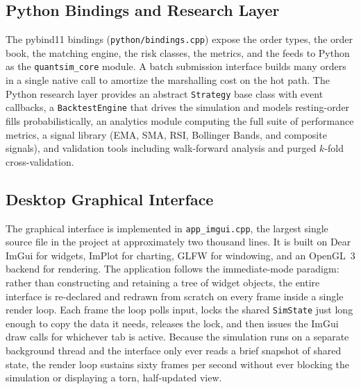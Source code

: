 \documentclass[12pt,oneside,a4paper]{report}
\begin{document}
\subsection{Python Bindings and Research Layer}

The pybind11 bindings (\texttt{python/bindings.cpp}) expose the order types, the order book, the matching engine, the risk classes, the metrics, and the feeds to Python as the \texttt{quantsim\_core} module. A batch submission interface builds many orders in a single native call to amortize the marshalling cost on the hot path. The Python research layer provides an abstract \texttt{Strategy} base class with event callbacks, a \texttt{BacktestEngine} that drives the simulation and models resting-order fills probabilistically, an analytics module computing the full suite of performance metrics, a signal library (EMA, SMA, RSI, Bollinger Bands, and composite signals), and validation tools including walk-forward analysis and purged $k$-fold cross-validation.

\subsection{Desktop Graphical Interface}
\label{sec:gui-module}

The graphical interface is implemented in \texttt{app\_imgui.cpp}, the largest single source file in the project at approximately two thousand lines. It is built on Dear ImGui for widgets, ImPlot for charting, GLFW for windowing, and an OpenGL~3 backend for rendering. The application follows the immediate-mode paradigm: rather than constructing and retaining a tree of widget objects, the entire interface is re-declared and redrawn from scratch on every frame inside a single render loop. Each frame the loop polls input, locks the shared \texttt{SimState} just long enough to copy the data it needs, releases the lock, and then issues the ImGui draw calls for whichever tab is active. Because the simulation runs on a separate background thread and the interface only ever reads a brief snapshot of shared state, the render loop sustains sixty frames per second without ever blocking the simulation or displaying a torn, half-updated view.
\end{document}
